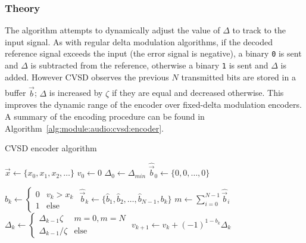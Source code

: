 \subsubsection{Theory}
\label{module:audio:cvsd:theory}
The algorithm attempts to dynamically adjust the value of $\Delta$
to track to the input signal.
As with regular delta modulation algorithms,
if the decoded reference signal exceeds the input (the error signal is
negative), a binary {\tt 0} is sent and $\Delta$ is subtracted from the
reference, otherwise a binary {\tt 1} is sent and $\Delta$ is added.
However CVSD observes the previous $N$ transmitted bits are stored in a
buffer $\hat{\vec{b}}$;
$\Delta$ is increased by $\zeta$ if they are equal and decreased
otherwise.
This improves the dynamic range of the encoder over fixed-delta
modulation encoders.
%
A summary of the encoding procedure can be found in
Algorithm~\ref{alg:module:audio:cvsd:encoder}.
%
\begin{algorithm}[H]
\caption{CVSD encoder algorithm}
\label{alg:module:audio:cvsd:encoder}
\begin{algorithmic}[1]
\STATE $\vec{x} \leftarrow \{x_0,x_1,x_2,\ldots\}$  
\STATE $v_0 \leftarrow 0$                           
\STATE $\Delta_0 \leftarrow \Delta_{min}$           
\STATE $\hat{\vec{b}}_0 \leftarrow \{0,0,\ldots,0\}$

    \STATE $b_k \leftarrow \begin{cases} 0 & v_k  > x_k \\ 1 & \text{else}\end{cases}$
    \STATE $\hat{\vec{b}}_k \leftarrow  \{\hat{b}_1,\hat{b}_2,\ldots,\hat{b}_{N-1},b_k\}$
    \STATE $m \leftarrow \sum_{i=0}^{N-1}{\hat{\vec{b}}_i}$
    \STATE $\Delta_k \leftarrow \begin{cases}\Delta_{k-1}\zeta & m = 0, m=N \\ \Delta_{k-1}/\zeta & \text{else}\end{cases}$
    \STATE $v_{k+1} \leftarrow v_k + (-1)^{1-b_k} \Delta_k$
\ENDFOR
\end{algorithmic}
\end{algorithm}
%

